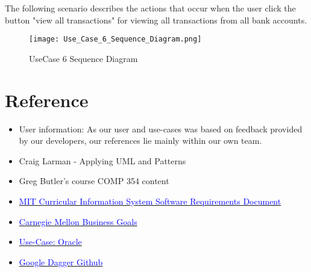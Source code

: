 \documentclass[12pt]{article}
\begin{document}
The following scenario describes the actions that occur when the user click the button "view all transactions" for viewing all transactions from all bank accounts.

\begin{figure}[H]
\texttt{[image: Use\_Case\_6\_Sequence\_Diagram.png]}
\caption{UseCase 6 Sequence Diagram}
\label{fig:use-case-6-sequence-diagram}
\end{figure}

\clearpage

\section{Reference}

\begin{itemize}
\item User information: As our user and use-cases was based on feedback provided by our developers, our references lie mainly within our own team.
\item Craig Larman - Applying UML and Patterns
\item Greg Butler's course COMP 354 content
\item \href{http://web.mit.edu/ssit/cis/CISRequirements.html}{\textcolor{blue}{MIT Curricular Information System
Software Requirements Document}}
\item \href{https://resources.sei.cmu.edu/asset_files/TechnicalReport/2005_005_001_14621.pdf}{\textcolor{blue}{Carnegie Mellon Business Goals}}
\item \href{http://www.oracle.com/technetwork/testcontent/gettingstartedwithusecasemodeling-133857.pdf}{\textcolor{blue}{Use-Case: Oracle }}
\item \href{https://github.com/google/dagger}{\textcolor{blue}{Google Dagger Github}}

\end{itemize}
\end{document}
